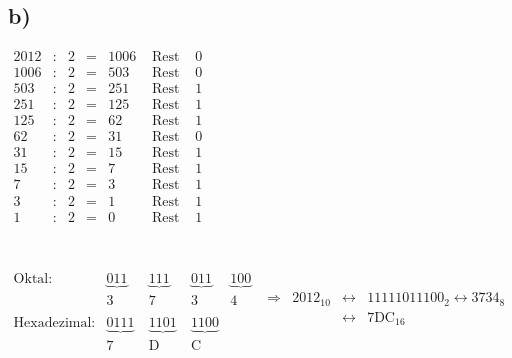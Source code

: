 \documentclass[a4paper]{scrartcl}
\begin{document}
	\subsection{b)}
		\(
		\begin{array}{rclclcc}
			2012 &:& 2 &=& 1006 &\text{ Rest } &0 \\
			1006 &:& 2 &=& 503  &\text{ Rest } &0 \\
			503  &:& 2 &=& 251  &\text{ Rest } &1 \\
			251  &:& 2 &=& 125  &\text{ Rest } &1 \\
			125  &:& 2 &=& 62   &\text{ Rest } &1 \\
			62   &:& 2 &=& 31   &\text{ Rest } &0 \\
			31   &:& 2 &=& 15   &\text{ Rest } &1 \\
			15   &:& 2 &=& 7    &\text{ Rest } &1 \\
			7    &:& 2 &=& 3    &\text{ Rest } &1 \\
			3    &:& 2 &=& 1    &\text{ Rest } &1 \\
			1    &:& 2 &=& 0    &\text{ Rest } &1 \\	
		\end{array}
		\)\\ \\ \\
		\(
		\begin{array}{lcccc}
			\text{Oktal:}&\underbrace{011}\ &\underbrace{111}\ &\underbrace{011}\ &\underbrace{100}\\
				&3&7&3&4 \\ \\
			\text{Hexadezimal:}&\underbrace{0111}\ &\underbrace{1101}\ &\underbrace{1100} \\
				&7&\text{D}&\text{C}
		\end{array}
		\)
		\(
		\begin{array}{rlcl}
			\Rightarrow & 2012_{10} &\leftrightarrow & 11111011100_2 \leftrightarrow 3734_8 \\ 
			    &&\leftrightarrow & \text{7DC}_{16}\\
		\end{array}
		\)
		
\end{document}

